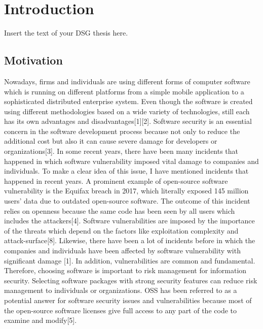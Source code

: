 %
\section{Introduction}\label{sec:introduction}
%
Insert the text of your \acs{DSG} thesis here.
\subsection{Motivation}
Nowadays, firms and individuals are using different forms of computer software which is running on different platforms from a simple mobile application to a sophisticated distributed enterprise system. Even though the software is created using different methodologies based on a wide variety of technologies, still each has its own advantages and disadvantages[1][2]. Software security is an essential concern in the software development process because not only to reduce the additional cost but also it can cause severe damage for developers or organizations[3]. In some recent years, there have been many incidents that happened in which software vulnerability imposed vital damage to companies and individuals. To make a clear idea of this issue, I have mentioned incidents that happened in recent years. A prominent example of open-source software vulnerability is the Equifax breach in 2017, which literally exposed 145 million users' data due to outdated open-source software. The outcome of this incident relies on openness because the same code has been seen by all users which includes the attackers[4]. Software vulnerabilities are imposed by the importance of the threats which depend on the factors like exploitation complexity and attack-surface[8]. Likewise, there have been a lot of incidents before in which the companies and individuals have been affected by software vulnerability with significant damage [1]. In addition, vulnerabilities are common and fundamental. Therefore, choosing software is important to risk management for information security. Selecting software packages with strong security features can reduce risk management to individuals or organizations. \acs{OSS} has been referred to as a potential answer for software security issues and vulnerabilities because most of the open-source software licenses give full access to any part of the code to examine and modify[5].

